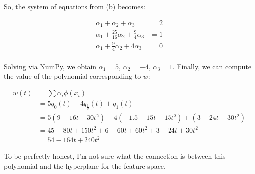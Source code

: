 \documentclass[fleqn]{homework}
\begin{document}
\begin{problem}{4}
\begin{enumerate}[(a)]
      So, the system of equations from (b) becomes:

      \begin{align*}
        \alpha_1 + \alpha_2 + \alpha_3 &= 2 \\
        \alpha_1 + \frac{25}{16}\alpha_2 + \frac{9}{4} \alpha_3&= 1 \\
        \alpha_1 +\frac{9}{4}\alpha_2 + 4\alpha_3 &= 0 \\
      \end{align*}

      Solving via NumPy, we obtain $\alpha_1 = 5$, $\alpha_2 = -4$,
      $\alpha_3 = 1$.  Finally, we can compute the value of the polynomial
      corresponding to $w$:

      \begin{align*}
        w(t) &= \sum \alpha_i \phi(x_i) \\
        &= 5 q_0(t) - 4 q_{\frac{1}{2}}(t) + q_1(t) \\
        &= 5 (9 - 16t + 30t^2) - 4(-1.5 + 15 t - 15t^2) + (3 - 24t + 30t^2) \\
        &= 45 - 80t + 150t^2 + 6 - 60t + 60t^2 + 3 - 24t + 30t^2 \\
        &= 54 - 164t + 240t^2
      \end{align*}

      To be perfectly honest, I'm not sure what the connection is between this
      polynomial and the hyperplane for the feature space.
    \end{enumerate}
  \end{problem}
\end{document}
